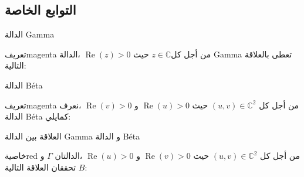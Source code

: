 \documentclass[dvipsnames,mathserif]{beamer}
\begin{document}
\subsection{التوابع الخاصة}
 \begin{frame}{الدالة Gamma}
\begin{box3}{ تعريف}{magenta}
{\LARGE{}}
من أجل كل$z\in \mathbb{C}$ حيث 
$\operatorname{Re}(z)>0$ 
 ،الدالة Gamma تعطى بالعلاقة التالية: 
\begin{center}
\end{center}
  \end{box3}
  \end{frame}
  \begin{frame}{الدالة Béta}
\begin{box3}{ تعريف}{magenta}
{\LARGE{}}
من أجل كل $(u,v)\in {{\mathbb{C}}^{2}}$ حيث $\operatorname{Re}(u)>0$ و $\operatorname{Re}(v)>0$ ،نعرف الدالة Béta كمايلي:
\begin{center}
\end{center}
  \end{box3}
  \end{frame}
  \begin{frame}{ العلاقة بين الدالة Gamma و الدالة Béta}
\begin{box2}{ خاصية}{red}
{\LARGE{}}
من أجل كل $(u,v)\in {{\mathbb{C}}^{2}}$ حيث   $\operatorname{Re}(v)>0$  و $\operatorname{Re}(u)>0$   
،الدالتان  $\Gamma $  و $B$   تحققان العلاقة التالية:
\begin{center}
\end{center}
  \end{box2}
  \end{frame}
\end{document}
